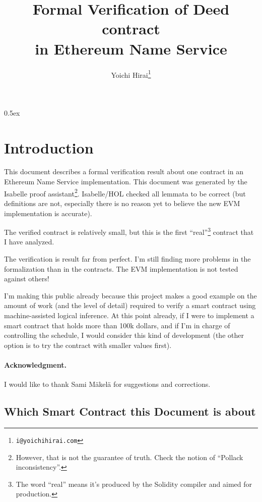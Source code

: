 \documentclass[11pt,a4paper]{article}
\begin{document}
\title{Formal Verification of Deed contract\\in Ethereum Name Service}
\author{Yoichi Hirai\footnote{\texttt{i@yoichihirai.com}}}
\maketitle

\tableofcontents

\parindent 0pt\parskip 0.5ex

\section{Introduction}

This document describes a formal verification result about one contract in
an Ethereum Name Service implementation.
This document was generated by the Isabelle proof assistant\footnote{However, that is not the guarantee of truth.  Check the notion of ``Pollack inconsistency''.}.
Isabelle/HOL checked all lemmata to be correct (but definitions are not,
especially there is no reason yet to believe the new EVM implementation is accurate).

The verified contract is relatively small,
but this is the first ``real''\footnote{The word ``real'' means it's
produced by the Solidity compiler and aimed for production.}
contract that I have analyzed.

The verification is result far from perfect.
I'm still finding more problems in the
formalization than in the contracts.  The EVM implementation is not tested against
others!

I'm making this public already because this project makes a
good example on the amount of work (and the level of detail) required to
verify a smart contract using machine-assisted logical inference.  At this
point already, if I were to
implement a smart contract that holds more than 100k dollars, and if
I'm in charge of controlling the schedule, I would consider this kind of
development (the other option is to try the contract with smaller values first).

\paragraph{Acknowledgment.} I would like to thank Sami M\"akel\"a for suggestions and corrections.

\subsection{Which Smart Contract this Document is about}
\end{document}
